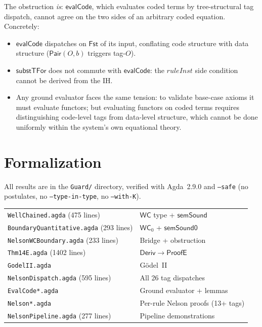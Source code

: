\documentclass[11pt]{article}
\newcommand{\Deriv}{\mathsf{Deriv}}
\newcommand{\WC}{\mathsf{WC}}
\newcommand{\WCz}{\mathsf{WC}_0}
\newcommand{\ProofE}{\mathsf{ProofE}}
\newcommand{\evalCode}{\mathsf{evalCode}}
\newcommand{\substTFor}{\mathsf{substTFor}}
\newcommand{\Pair}{\mathsf{Pair}}
\begin{document}
The obstruction \emph{is}: $\evalCode$, which evaluates coded terms
by tree-structural tag dispatch, cannot agree on the two sides of an
arbitrary coded equation. Concretely:
\begin{itemize}
\item $\evalCode$ dispatches on $\mathsf{Fst}$ of its input, conflating
  code structure with data structure ($\Pair(O,b)$ triggers tag-$O$).
\item $\substTFor$ does not commute with $\evalCode$: the
  $\mathit{ruleInst}$ side condition cannot be derived from the IH.
\item Any ground evaluator faces the same tension: to validate
  base-case axioms it must evaluate functors; but evaluating functors
  on coded terms requires distinguishing code-level tags from data-level
  structure, which cannot be done uniformly within the system's own
  equational theory.
\end{itemize}

\section{Formalization}

All results are in the \texttt{Guard/} directory, verified with
Agda~2.9.0 and \texttt{--safe} (no postulates, no \texttt{--type-in-type},
no \texttt{--with-K}).

\smallskip
\begin{center}
\begin{tabular}{ll}
\texttt{WellChained.agda} (475 lines) & $\WC$ type + $\mathsf{semSound}$ \\
\texttt{BoundaryQuantitative.agda} (293 lines) & $\WCz$ + $\mathsf{semSound0}$ \\
\texttt{NelsonWCBoundary.agda} (233 lines) & Bridge + obstruction \\
\texttt{Thm14E.agda} (1402 lines) & $\Deriv \to \ProofE$ \\
\texttt{GodelII.agda} & G\"odel~II \\
\texttt{NelsonDispatch.agda} (595 lines) & All 26 tag dispatches \\
\texttt{EvalCode*.agda} & Ground evaluator + lemmas \\
\texttt{Nelson*.agda} & Per-rule Nelson proofs (13+ tags) \\
\texttt{NelsonPipeline.agda} (277 lines) & Pipeline demonstrations \\
\end{tabular}
\end{center}
\end{document}
